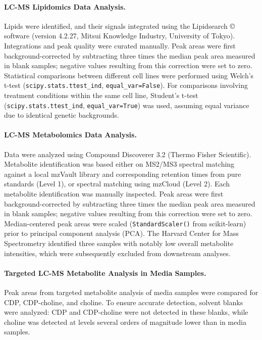 \documentclass[12pt]{article}
\begin{document}
\paragraph{LC-MS Lipidomics Data Analysis.}
Lipids were identified, and their signals integrated using the Lipidsearch © software (version 4.2.27, Mitsui Knowledge Industry, University of Tokyo). Integrations and peak quality were curated manually. Peak areas were first background-corrected by subtracting three times the median peak area measured in blank samples; negative values resulting from this correction were set to zero. Statistical comparisons between different cell lines were performed using Welch's t-test (\texttt{scipy.stats.ttest\_ind}, \texttt{equal\_var=False}). For comparisons involving treatment conditions within the same cell line, Student's t-test (\texttt{scipy.stats.ttest\_ind}, \texttt{equal\_var=True}) was used, assuming equal variance due to identical genetic backgrounds.

\paragraph{LC-MS Metabolomics Data Analysis.}
Data were analyzed using Compound Discoverer 3.2 (Thermo Fisher Scientific). Metabolite identification was based either on MS2/MS3 spectral matching against a local mzVault library and corresponding retention times from pure standards (Level 1), or spectral matching using mzCloud (Level 2). Each metabolite identification was manually inspected. Peak areas were first background-corrected by subtracting three times the median peak area measured in blank samples; negative values resulting from this correction were set to zero. Median-centered peak areas were scaled (\texttt{StandardScaler()} from scikit-learn) prior to principal component analysis (PCA). The Harvard Center for Mass Spectrometry identified three samples with notably low overall metabolite intensities, which were subsequently excluded from downstream analyses.

\paragraph{Targeted LC-MS Metabolite Analysis in Media Samples.}
Peak areas from targeted metabolite analysis of media samples were compared for CDP, CDP-choline, and choline. To ensure accurate detection, solvent blanks were analyzed: CDP and CDP-choline were not detected in these blanks, while choline was detected at levels several orders of magnitude lower than in media samples.
\end{document}
